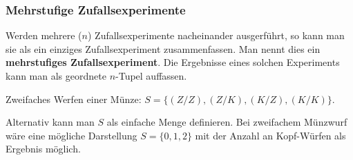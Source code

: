 \documentclass[main.tex]{subfiles}
\begin{document}
\subsubsection{Mehrstufige Zufallsexperimente}
\begin{Definition}
  Werden mehrere ($n$) Zufallsexperimente nacheinander ausgerführt, so kann man sie als ein einziges Zufallsexperiment zusammenfassen. Man nennt dies ein \textbf{mehrstufiges Zufallsexperiment}. Die Ergebnisse eines solchen Experiments kann man als geordnete $n$-Tupel auffassen.
\end{Definition}
\begin{Beispiel}
  Zweifaches Werfen einer Münze: $S=\{ (Z/Z),(Z/K),(K/Z),(K/K)\} $.\\
\end{Beispiel}
\begin{Bemerkung}
  Alternativ kann man $S$ als einfache Menge definieren. Bei zweifachem Münzwurf wäre eine mögliche Darstellung $S = \{ 0,1,2\}$ mit der Anzahl an Kopf-Würfen als Ergebnis möglich.
\end{Bemerkung}
\end{document}
